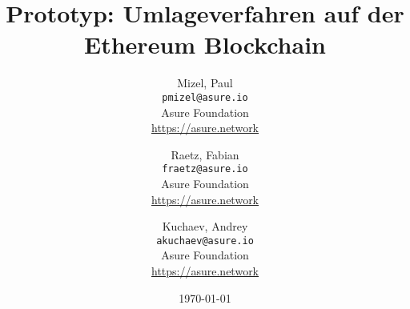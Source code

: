 
\title{Prototyp: Umlageverfahren auf der Ethereum Blockchain}
\author{
  Mizel, Paul\\
  \texttt{pmizel@asure.io}\\
  Asure Foundation \\ 
  {\url{https://asure.network}}\\
  \and
  Raetz, Fabian\\
  \texttt{fraetz@asure.io}\\
  Asure Foundation \\ 
  {\url{https://asure.network}}\\
  \and
  Kuchaev, Andrey\\
  \texttt{akuchaev@asure.io}\\
  Asure Foundation \\ 
  {\url{https://asure.network}}\\
}

\date{\today}
\maketitle

